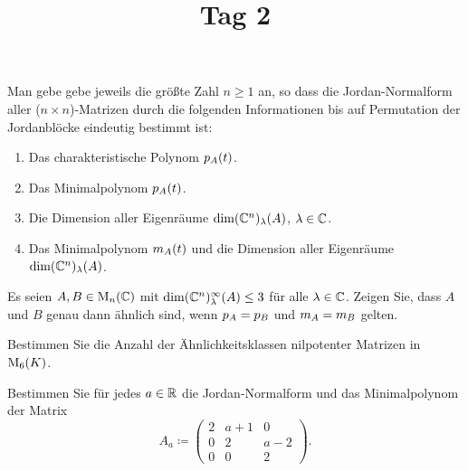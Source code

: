 \documentclass[a4paper, 10pt]{scrartcl}
\title{Tag 2}
\author{}
\date{}
\begin{document}
\begin{question}
  Man gebe gebe jeweils die größte Zahl $n \geq 1$ an, so dass die Jordan-Normalform aller ($n \times n$)-Matrizen durch die folgenden Informationen bis auf Permutation der Jordanblöcke eindeutig bestimmt ist:
  \begin{enumerate}
    \item
      Das charakteristische Polynom $p_{A}(t)$.
    \item
      Das Minimalpolynom $p_{A}(t)$.
    \item
      Die Dimension aller Eigenräume $\dim (\mathbb{C}^n)_{\lambda}(A)$, $\lambda \in \mathbb{C}$.
    \item
      Das Minimalpolynom $m_{A}(t)$ und die Dimension aller Eigenräume $\dim (\mathbb{C}^n)_{\lambda}(A)$.
  \end{enumerate}
\end{question}





\begin{question}
  Es seien $A, B \in \operatorname{M}_{n}(\mathbb{C})$ mit $\dim (\mathbb{C}^n)_{\lambda}^{\infty}(A) \leq 3$ für alle $\lambda \in \mathbb{C}$.
  Zeigen Sie, dass $A$ und $B$ genau dann ähnlich sind, wenn $p_{A} = p_{B}$ und $m_{A} = m_{B}$ gelten.
\end{question}





\begin{question}
  Bestimmen Sie die Anzahl der Ähnlichkeitsklassen nilpotenter Matrizen in $\operatorname{M}_{6}(K)$.
\end{question}





\begin{question}
  Bestimmen Sie für jedes $a \in \mathbb{R}$ die Jordan-Normalform und das Minimalpolynom der Matrix
  \[
              A_a
    \coloneqq \begin{pmatrix}
                2 & a+1 &  0  \\
                0 &  2  & a-2 \\
                0 &  0  &  2
              \end{pmatrix}.
  \]
\end{question}
\end{document}
